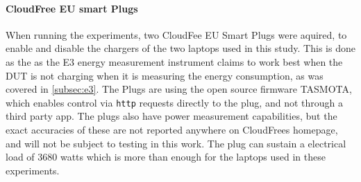 \paragraph*{CloudFree EU smart Plugs}

When running the experiments, two CloudFee EU Smart Plugs were aquired, to enable and disable the chargers of the two laptops used in this study. This is done as the as the E3 energy measurement instrument claims to work best when the DUT is not charging when it is measuring the energy consumption, as was covered in \cref{subsec:e3}. The Plugs are using the open source firmware TASMOTA\cite{TomatoGit}, which enables control via \texttt{http} requests directly to the plug, and not through a third party app. The plugs also have power measurement capabilities, but the exact accuracies of these are not reported anywhere on CloudFrees homepage, and will not be subject to testing in this work. The plug can sustain a electrical load of 3680 watts which is more than enough for the laptops used in these experiments.